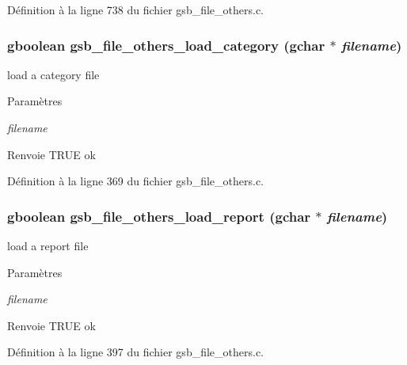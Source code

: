 Définition à la ligne 738 du fichier gsb\_\-file\_\-others.c.

\subsubsection[{gsb\_\-file\_\-others\_\-load\_\-category}]{\setlength{\rightskip}{0pt plus 5cm}gboolean gsb\_\-file\_\-others\_\-load\_\-category (gchar $\ast$ {\em filename})}\label{gsb__file__others_8c_a0cdca31242b817da6c6a18839e41ec90}
load a category file


\begin{DoxyParams}{Paramètres}
\item[{\em filename}]\end{DoxyParams}
\begin{DoxyReturn}{Renvoie}
TRUE ok 
\end{DoxyReturn}


Définition à la ligne 369 du fichier gsb\_\-file\_\-others.c.

\subsubsection[{gsb\_\-file\_\-others\_\-load\_\-report}]{\setlength{\rightskip}{0pt plus 5cm}gboolean gsb\_\-file\_\-others\_\-load\_\-report (gchar $\ast$ {\em filename})}\label{gsb__file__others_8c_a03383737bac0b4cf40a29a702019457f}
load a report file


\begin{DoxyParams}{Paramètres}
\item[{\em filename}]\end{DoxyParams}
\begin{DoxyReturn}{Renvoie}
TRUE ok 
\end{DoxyReturn}


Définition à la ligne 397 du fichier gsb\_\-file\_\-others.c.

